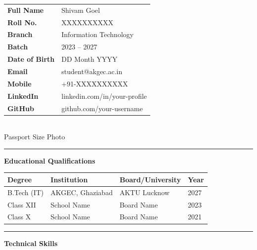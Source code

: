 \noindent
\begin{minipage}[t]{0.72\textwidth}
  \begin{tabular}{@{}p{3.5cm}p{7cm}}
    \textbf{Full Name}      & Shivam Goel \\[4pt]
    \textbf{Roll No.}       & XXXXXXXXXX \\[4pt]
    \textbf{Branch}         & Information Technology \\[4pt]
    \textbf{Batch}          & 2023 -- 2027 \\[4pt]
    \textbf{Date of Birth}  & DD Month YYYY \\[4pt]
    \textbf{Email}          & student@akgec.ac.in \\[4pt]
    \textbf{Mobile}         & +91-XXXXXXXXXX \\[4pt]
    \textbf{LinkedIn}       & linkedin.com/in/your-profile \\[4pt]
    \textbf{GitHub}         & github.com/your-username \\
  \end{tabular}
\end{minipage}
\hfill
\begin{minipage}[t]{0.24\textwidth}
  \centering
  \setlength{\fboxsep}{0pt}
  \fbox{\rule{3.5cm}{0pt}\rule{0pt}{4.5cm}}\\[2pt]
  {\small Passport Size Photo}
\end{minipage}

\vspace{0.5cm}\hrule\vspace{0.4cm}

\noindent\textbf{Educational Qualifications}
\vspace{0.2cm}

\begin{tabular}{@{}p{2.5cm}p{5cm}p{3cm}p{1.5cm}@{}}
\toprule
\textbf{Degree} & \textbf{Institution} & \textbf{Board/University} & \textbf{Year} \\
\midrule
B.Tech (IT)    & AKGEC, Ghaziabad       & AKTU Lucknow & 2027 \\
Class XII       & School Name            & Board Name   & 2023 \\
Class X         & School Name            & Board Name   & 2021 \\
\bottomrule
\end{tabular}

\vspace{0.4cm}\hrule\vspace{0.4cm}

\noindent\textbf{Technical Skills}
\vspace{0.2cm}

